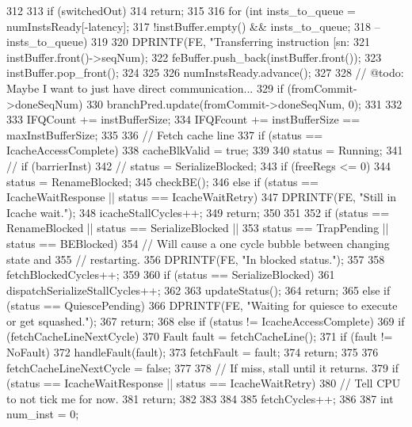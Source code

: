 \begin{DoxyCode}
312 {
313     if (switchedOut)
314         return;
315 
316     for (int insts_to_queue = numInstsReady[-latency];
317          !instBuffer.empty() && insts_to_queue;
318          --insts_to_queue)
319     {
320         DPRINTF(FE, "Transferring instruction [sn:%
321                 instBuffer.front()->seqNum);
322         feBuffer.push_back(instBuffer.front());
323         instBuffer.pop_front();
324     }
325 
326     numInstsReady.advance();
327 
328     // @todo: Maybe I want to just have direct communication...
329     if (fromCommit->doneSeqNum) {
330         branchPred.update(fromCommit->doneSeqNum, 0);
331     }
332 
333     IFQCount += instBufferSize;
334     IFQFcount += instBufferSize == maxInstBufferSize;
335 
336     // Fetch cache line
337     if (status == IcacheAccessComplete) {
338         cacheBlkValid = true;
339 
340         status = Running;
341 //        if (barrierInst)
342 //            status = SerializeBlocked;
343         if (freeRegs <= 0)
344             status = RenameBlocked;
345         checkBE();
346     } else if (status == IcacheWaitResponse || status == IcacheWaitRetry) {
347         DPRINTF(FE, "Still in Icache wait.\n");
348         icacheStallCycles++;
349         return;
350     }
351 
352     if (status == RenameBlocked || status == SerializeBlocked ||
353         status == TrapPending || status == BEBlocked) {
354         // Will cause a one cycle bubble between changing state and
355         // restarting.
356         DPRINTF(FE, "In blocked status.\n");
357 
358         fetchBlockedCycles++;
359 
360         if (status == SerializeBlocked) {
361             dispatchSerializeStallCycles++;
362         }
363         updateStatus();
364         return;
365     } else if (status == QuiescePending) {
366         DPRINTF(FE, "Waiting for quiesce to execute or get squashed.\n");
367         return;
368     } else if (status != IcacheAccessComplete) {
369         if (fetchCacheLineNextCycle) {
370             Fault fault = fetchCacheLine();
371             if (fault != NoFault) {
372                 handleFault(fault);
373                 fetchFault = fault;
374                 return;
375             }
376             fetchCacheLineNextCycle = false;
377         }
378         // If miss, stall until it returns.
379         if (status == IcacheWaitResponse || status == IcacheWaitRetry) {
380             // Tell CPU to not tick me for now.
381             return;
382         }
383     }
384 
385     fetchCycles++;
386 
387     int num_inst = 0;
}
\end{DoxyCode}
